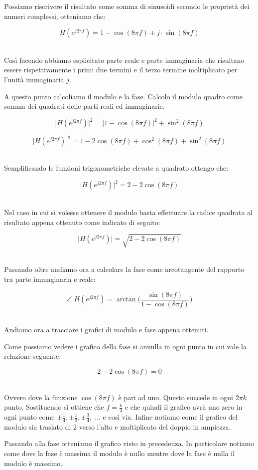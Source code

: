 \documentclass[../main.tex]{subfiles}
\begin{document}
Possiamo riscrivere il risultato come somma di sinusoidi secondo le proprietà dei numeri complessi, otteniamo che:

\[ H(e^{j2\pi f}) = 1 - \cos(8\pi f) + j\cdot \sin(8\pi f) \]\

Così facendo abbiamo esplicitato parte reale e parte immaginaria che risultano essere rispettivamente i primi due termini e il terzo termine moltiplicato per l'unità immaginaria $j$.

A questo punto calcoliamo il modulo e la fase.
Calcolo il modulo quadro come somma dei quadrati delle parti reali ed immaginarie.

\[ \big| H(e^{j2\pi f}) \big|^2 = \big[1 - \cos(8\pi f)\big]^2 + \sin^2(8\pi f) \]

\[ \big| H(e^{j2\pi f}) \big|^2  = 1 - 2\cos(8\pi f) + \cos^2(8\pi f) +\sin^2(8\pi f)\]\

Semplificando le funzioni trigonometriche elevate a quadrato ottengo che:

\[ \big| H(e^{j2\pi f}) \big|^2 = 2 - 2\cos(8\pi f) \]\

Nel caso in cui si volesse ottenere il modulo basta effettuare la radice quadrata al risultato appena ottenuto come indicato di seguito:

\[ \big| H(e^{j2\pi f}) \big| = \sqrt{2 - 2\cos(8\pi f) }   \]\

Passando oltre andiamo ora a calcolare la fase come arcotangente del rapporto tra parte immaginaria e reale:

\[ \angle \; H(e^{j2\pi f}) =  \arctan\bigg( \frac{\sin(8\pi f)}{1 - \cos(8\pi f)}  \bigg)\]\

Andiamo ora a tracciare i grafici di modulo e fase appena ottenuti.


Come possiamo vedere i grafico della fase si annulla in ogni punto in cui vale la relazione seguente:

\[ 2 - 2\cos(8\pi f) = 0 \]\

Ovvero dove la funzione $\cos(8\pi f)$ è pari ad uno. Questo succede in ogni $2\pi k$ punto. Sostituendo si ottiene che $f = \frac{k}{4}$ e che quindi il grafico avrà uno zero in ogni punto come $\pm \frac{1}{4}, \pm \frac{1}{2}, \pm \frac{3}{4},\; \dots $ e così via. Infine notiamo come il grafico del modulo sia traslato di 2 verso l'alto e moltiplicato del doppio in ampiezza.

Passando alla fase otteniamo il grafico visto in precedenza. In particolare notiamo come dove la fase è massima il modulo è nullo mentre dove la fase è nulla il modulo è massimo.\\
\end{document}
